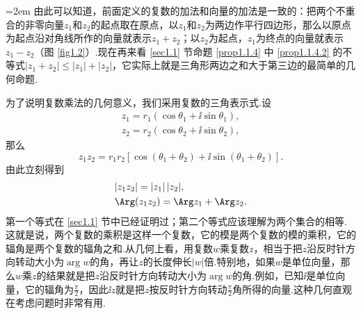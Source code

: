 \noindent\begin{minipage}{0.4\textwidth}
\centering
{}
\end{minipage}
\begin{minipage}{0.6\textwidth}\parindent=2em
由此可以知道，前面定义的复数的加法和向量的加法是一致的：把两个不重合的非零向量$z_1$和$z_2$的起点取在原点，以$z_1$和$z_2$为两边作平行四边形，那么以原点为起点沿对角线所作的向量就表示$z_1+z_2$；以$z_2$为起点，$z_1$为终点的向量就表示$z_1-z_2$（图 \ref{fig1.2}）.现在再来看 \ref{sec1.1} 节命题 \ref{prop1.1.4} 中 \ref{prop1.1.4.2} 的不等式$|z_1+z_2|\le|z_1|+|z_2|$，它实际上就是三角形两边之和大于第三边的最简单的几何命题.
\end{minipage}

为了说明复数乘法的几何意义，我们采用复数的三角表示式.设
\begin{gather*}
z_1=r_1(\cos\theta_1+\ii\sin\theta_1),\\
z_2=r_2(\cos\theta_2+\ii\sin\theta_2),
\end{gather*}
那么
\[z_1z_2=r_1r_2[\cos(\theta_1+\theta_2)+\ii\sin(\theta_1+\theta_2)].\]
由此立刻得到
\begin{align*}
&|z_1z_2|=|z_1|\,|z_2|,\\
&\Arg(z_1z_2)=\Arg z_1+\Arg z_2.
\end{align*}
第一个等式在 \ref{sec1.1} 节中已经证明过；第二个等式应该理解为两个集合的相等.这就是说，两个复数的乘积是这样一个复数，它的模是两个复数的模的乘积，它的辐角是两个复数的辐角之和.从几何上看，用复数$w$乘复数$z$，相当于把$z$沿反时针方向转动大小为$\arg w$的角，再让$z$的长度伸长$|w|$倍.特别地，如果$w$是单位向量，那么$w$乘$z$的结果就是把$z$沿反时针方向转动大小为$\arg w$的角.例如，已知$\ii$是单位向量，它的辐角为$\frac\pi2$，因此$\ii z$就是把$z$按反时针方向转动$\frac\pi2$角所得的向量.这种几何直观在考虑问题时非常有用.

